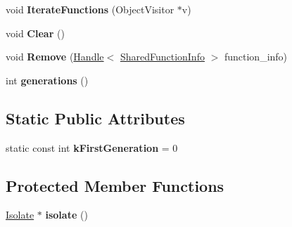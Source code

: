\begin{DoxyCompactItemize}
\item 
void {\bfseries Iterate\+Functions} (Object\+Visitor $\ast$v)\hypertarget{classv8_1_1internal_1_1_compilation_sub_cache_abe652de54c8b1abb6210ddfc513b28cb}{}\label{classv8_1_1internal_1_1_compilation_sub_cache_abe652de54c8b1abb6210ddfc513b28cb}

\item 
void {\bfseries Clear} ()\hypertarget{classv8_1_1internal_1_1_compilation_sub_cache_a9d3e099a1911e1e7a836b7df82d2e03b}{}\label{classv8_1_1internal_1_1_compilation_sub_cache_a9d3e099a1911e1e7a836b7df82d2e03b}

\item 
void {\bfseries Remove} (\hyperlink{classv8_1_1internal_1_1_handle}{Handle}$<$ \hyperlink{classv8_1_1internal_1_1_shared_function_info}{Shared\+Function\+Info} $>$ function\+\_\+info)\hypertarget{classv8_1_1internal_1_1_compilation_sub_cache_a3fd0a729c12e76a804fc2fe3145ffd56}{}\label{classv8_1_1internal_1_1_compilation_sub_cache_a3fd0a729c12e76a804fc2fe3145ffd56}

\item 
int {\bfseries generations} ()\hypertarget{classv8_1_1internal_1_1_compilation_sub_cache_aa52ea32923a9315f2737467f210b8704}{}\label{classv8_1_1internal_1_1_compilation_sub_cache_aa52ea32923a9315f2737467f210b8704}

\end{DoxyCompactItemize}
\subsection*{Static Public Attributes}
\begin{DoxyCompactItemize}
\item 
static const int {\bfseries k\+First\+Generation} = 0\hypertarget{classv8_1_1internal_1_1_compilation_sub_cache_ac9d60da247fabc94383eabd9825fc203}{}\label{classv8_1_1internal_1_1_compilation_sub_cache_ac9d60da247fabc94383eabd9825fc203}

\end{DoxyCompactItemize}
\subsection*{Protected Member Functions}
\begin{DoxyCompactItemize}
\item 
\hyperlink{classv8_1_1internal_1_1_isolate}{Isolate} $\ast$ {\bfseries isolate} ()\hypertarget{classv8_1_1internal_1_1_compilation_sub_cache_ade6feffbd1eb87a71e3bcfabe1d675d6}{}\label{classv8_1_1internal_1_1_compilation_sub_cache_ade6feffbd1eb87a71e3bcfabe1d675d6}

\end{DoxyCompactItemize}
